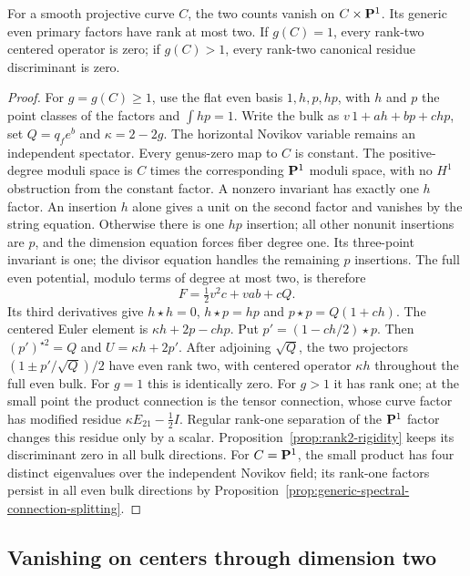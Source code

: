 \begin{lemma}
\label{lem:ruled-product}%
For a smooth projective curve $C$, the two counts vanish on $C\times\mathbf P^1$.
Its generic even primary factors have rank at most two.
If $g(C)=1$, every rank-two centered operator is zero; if $g(C)>1$,
every rank-two canonical residue discriminant is zero.
\end{lemma}
\begin{proof}
For $g=g(C)\ge1$, use the flat even basis $1,h,p,hp$, with $h$ and $p$
the point classes of the factors and $\int hp=1$. Write the bulk as
$v\,1+ah+bp+chp$, set $Q=q_f e^b$ and $\kappa=2-2g$.
The horizontal Novikov variable remains an independent spectator.
Every genus-zero map to $C$ is constant. The positive-degree moduli space
is $C$ times the corresponding $\mathbf P^1$ moduli space, with no $H^1$
obstruction from the constant factor. A nonzero invariant has exactly one
$h$ factor. An insertion $h$ alone gives a unit on the second factor and
vanishes by the string equation. Otherwise there is one $hp$ insertion;
all other nonunit insertions are $p$, and the dimension equation forces
fiber degree one. Its three-point invariant is one; the divisor equation
handles the remaining $p$ insertions. The full even potential, modulo
terms of degree at most two, is therefore
\[
 F=\tfrac12v^2c+vab+cQ.
\]
Its third derivatives give $h\star h=0$, $h\star p=hp$ and
$p\star p=Q(1+ch)$. The centered Euler element is $\kappa h+2p-chp$.
Put $p'=(1-ch/2)\star p$. Then $(p')^{\star2}=Q$ and
$U=\kappa h+2p'$. After adjoining $\sqrt Q$, the two projectors
$(1\pm p'/\sqrt Q)/2$ have even rank two, with centered operator
$\kappa h$ throughout the full even bulk.
For $g=1$ this is identically zero. For $g>1$ it has rank one; at the
small point the product connection is the tensor connection, whose curve
factor has modified residue $\kappa E_{21}-\tfrac12I$.
Regular rank-one separation of the $\mathbf P^1$ factor changes this residue
only by a scalar. Proposition~\ref{prop:rank2-rigidity} keeps its
discriminant zero in all bulk directions.
For $C=\mathbf P^1$, the small product has four distinct eigenvalues over the
independent Novikov field; its rank-one factors persist in all even bulk
directions by Proposition~\ref{prop:generic-spectral-connection-splitting}.
%
%
\end{proof}

\subsection{Vanishing on centers through dimension two}

